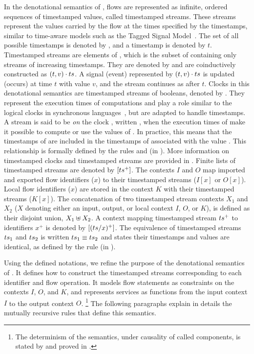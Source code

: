 In the denotational semantics of \GRFRP, flows are represented as infinite, ordered sequences of
timestamped values, called timestamped streams. These streams represent the values carried by the
flow at the times specified by the timestamps, similar to time-aware models such as the Tagged
Signal Model~\cite{DBLP:journals/tcad/LeeS98}. The set of all possible timestamps is denoted by
\Time, and a timestamp is denoted by $t$. Timestamped streams are elements of \TStream{\Val}, which
is the subset of \Stream{\Time \times \Val} containing only streams of increasing timestamps. They
are denoted by \ts and are coinductively constructed as $(t, v) \cdot ts$. A signal (\resp event)
represented by $(t, v) \cdot ts$ is updated (\resp occurs) at time $t$ with value $v$, and the
stream continues as \ts after $t$.
%
Clocks in this denotational semantics are timestamped streams of booleans, denoted by \tck.
They represent the execution times of computations and play a role similar to the logical clocks in
synchronous languages~\cite{DBLP:conf/emsoft/ColacoP03}, but are adapted to handle timestamps. A
stream \ts is said to be \emph{on} the clock \tck, written \on{\ts}{\tck}, when the
execution times of \tck make it possible to compute or use the values of \ts. In practice, this
means that the timestamps of \ts are included in the timestamps of \tck associated with the value
\true. This relationship is formally defined by the rules
 and 
(in ). More information on timestamped clocks and timestamped
streams are provided in .
%
Finite lists of timestamped streams are denoted by $[ts^+]$.
%
The contexts $I$ and $O$ map imported and exported flow identifiers ($x$) to their timestamped
streams ($I[x]$ or $O[x]$). Local flow identifiers ($x$) are stored in the context $K$ with their
timestamped streams ($K[x]$).
%
The concatenation of two timestamped stream contexts $X_1$ and $X_2$ ($X$ denoting either an input,
output, or local context $I$, $O$, or $K$), is defined as their disjoint union,
$X_1 \uplus X_2$. A context mapping timestamped stream $ts^+$ to identifiers $x^+$ is denoted
by $[(ts/x)^+]$.
%
The equivalence of timestamped streams $ts_1$ and $ts_2$ is written $ts_1 \equiv ts_2$ and
states their timestamps and values are identical, as defined by the rule 
(in ).

Using the defined notations, we refine the purpose of the denotational semantics of \GRFRP. It
defines how to construct the timestamped streams corresponding to each identifier and flow
operation. It models flow statements as constraints on the contexts $I$, $O$, and $K$, and
represents services as functions from the input context $I$ to the output context $O$.%
\footnote{The determinism of the semantics, under causality of called components, is stated by
     and proved in
    .}
%
The following paragraphs explain in details the mutually recursive rules that define this semantics.

